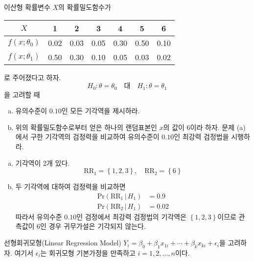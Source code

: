 \documentclass[answers]{exam}
\begin{document}
\begin{questions}
\begin{solution}
\begin{enumerate}[(a)]
\begin{equation}
      \end{equation}
      \end{enumerate}
   \end{solution}
   \question
   이산형 확률변수 $X$의 확률밀도함수가
   \begin{table}[!htbp]
    \centering
      \begin{tabular}{*7c}
        \toprule
        $X$ & 1 & 2 &3&4&5&6\\
        \toprule
        $f\left(x;\theta_{0}\right)$&0.02&0.03&0.05&0.30&0.50&0.10 \\
        \midrule
        $f\left(x;\theta_{1}\right)$&0.50&0.30&0.10&0.05&0.03&0.02\\ 
        \bottomrule
      \end{tabular}
    \end{table}
    로 주어졌다고 하자.
    $$
      H_{0}:\theta=\theta_{0}\quad \text{대} \quad H_{1}:\theta=\theta_{1}
    $$
    을 고려할 때
    \begin{enumerate}[(a)]
      \item 유의수준이 $0.10$인 모든 기각역을 제시하라.
      \item 위의 확률밀도함수로부터 얻은 하나의 랜덤표본인 $x$의 값이 $6$이라 하자. 문제 (a)에서 구한 기각역의 검정력을 비교하여 유의수준이 $0.10$인 최강력 검정법을 시행하라.
    \end{enumerate}
     \begin{solution}
      \begin{enumerate}[(a)]
        \item 기각역이 2개 있다.
        \begin{equation}
          \mathrm{RR}_{1} = \left\{1,2,3\right\},\quad \mathrm{RR}_{2}=\left\{6\right\}
        \end{equation}
        \item 두 기각역에 대하여 검정력을 비교하면
        \begin{align}
          \mathrm{Pr}\left(\mathrm{RR}_{1}\,|\,H_{1}\right) &= 0.9\\
          \mathrm{Pr}\left(\mathrm{RR}_{2}\,|\,H_{1}\right) &= 0.02
        \end{align}
        따라서 유의수준 $0.10$인 검정에서 최강력 검정법의 기각역은 $\left\{1,2,3\right\}$이므로 관측값이 $6$인 경우 귀무가설은 기각되지 않는다.
      \end{enumerate}
     \end{solution}
     \question
     선형회귀모형(Linear Regression Model) $Y_{i}=\beta_{0}+\beta_{1}x_{1i}+\cdots+\beta_{k}x_{ki}+\epsilon_{i}$을 고려하자. 여기서 $\epsilon_{i}$는 회귀모형 기본가정을 만족하고 $i=1,2,\ldots,n$이다.

\end{questions}
\end{document}

